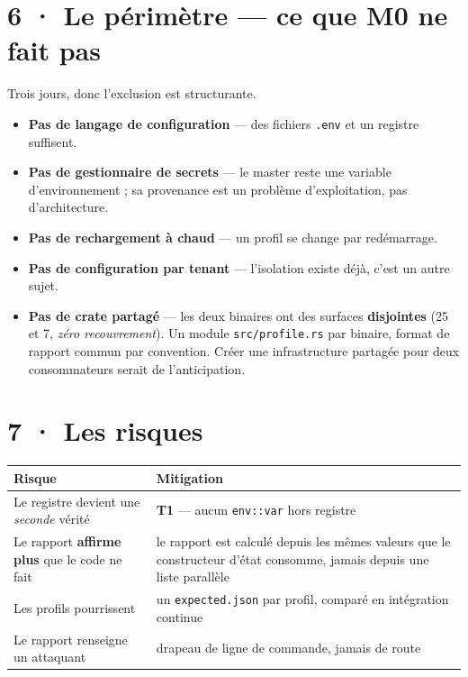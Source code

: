 \documentclass[10pt]{article}
\newcommand{\code}[1]{\texttt{\small #1}}
\begin{document}
\section{6 · Le périmètre --- ce que M0 ne fait pas}

Trois jours, donc l'exclusion est structurante.

\begin{itemize}[leftmargin=1.2em,itemsep=2pt,topsep=2pt]
\item \textbf{Pas de langage de configuration} --- des fichiers \code{.env} et un registre suffisent.
\item \textbf{Pas de gestionnaire de secrets} --- le master reste une variable d'environnement ; sa
      provenance est un problème d'exploitation, pas d'architecture.
\item \textbf{Pas de rechargement à chaud} --- un profil se change par redémarrage.
\item \textbf{Pas de configuration par tenant} --- l'isolation existe déjà, c'est un autre sujet.
\item \textbf{Pas de crate partagé} --- les deux binaires ont des surfaces \textbf{disjointes} (25 et 7,
      \emph{zéro recouvrement}). Un module \code{src/profile.rs} par binaire, format de rapport commun
      par convention. Créer une infrastructure partagée pour deux consommateurs serait de
      l'anticipation.
\end{itemize}

\section{7 · Les risques}

\renewcommand{\arraystretch}{1.22}
\begin{center}\small
\begin{tabular}{@{}>{\raggedright\arraybackslash}p{6.2cm} >{\raggedright\arraybackslash}p{9.6cm}@{}}
\toprule
\textbf{Risque} & \textbf{Mitigation} \\
\midrule
Le registre devient une \emph{seconde} vérité & \textbf{T1} --- aucun \code{env::var} hors registre \\
Le rapport \textbf{affirme plus} que le code ne fait & le rapport est calculé depuis les mêmes valeurs que le constructeur d'état consomme, jamais depuis une liste parallèle \\
Les profils pourrissent & un \code{expected.json} par profil, comparé en intégration continue \\
Le rapport renseigne un attaquant & drapeau de ligne de commande, jamais de route \\
\bottomrule
\end{tabular}
\end{center}
\end{document}
